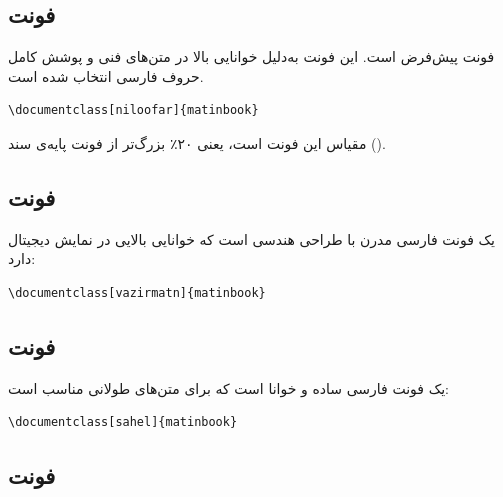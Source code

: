 \subsection{فونت }
\label{sec:fonts-niloofar}

 فونت پیش‌فرض 
است. این فونت به‌دلیل خوانایی بالا در متن‌های
فنی و پوشش کامل حروف فارسی انتخاب شده است.

\begin{latin}
\begin{verbatim}
\documentclass[niloofar]{matinbook}
\end{verbatim}
\end{latin}

مقیاس این فونت  است، یعنی ۲۰٪
بزرگ‌تر از فونت پایه‌ی سند (\pnum{۱۰pt}).


\subsection{فونت }
\label{sec:fonts-vazirmatn}

 یک فونت فارسی مدرن با طراحی
هندسی است که خوانایی بالایی در نمایش دیجیتال
دارد:

\begin{latin}
\begin{verbatim}
\documentclass[vazirmatn]{matinbook}
\end{verbatim}
\end{latin}


\subsection{فونت }
\label{sec:fonts-sahel}

 یک فونت فارسی ساده و خوانا است
که برای متن‌های طولانی مناسب است:

\begin{latin}
\begin{verbatim}
\documentclass[sahel]{matinbook}
\end{verbatim}
\end{latin}

\subsection{فونت }
\label{sec:fonts-irlotus}

